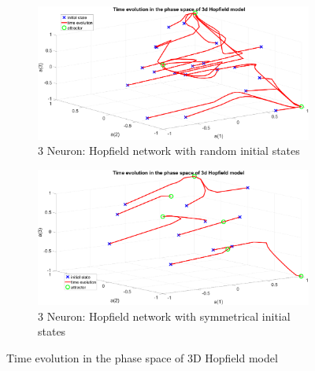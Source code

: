 \begin{figure}[!htpb]
	\centering
	\begin{subfigure}[b]{0.5\textwidth}
		\captionsetup{width=0.8\linewidth, format = hang}
		\includegraphics[height = 0.6\textwidth,width = 1\textwidth]{Exercise2/Report/hop3d_1}
		\caption{3 Neuron: Hopfield network with random initial states }\label{fig:hop3d_1}
	\end{subfigure}%
	\begin{subfigure}[b]{0.5\textwidth}
		\captionsetup{width=0.8\linewidth, format = hang}
		\includegraphics[height = 0.6\textwidth,width = 1\textwidth]{Exercise2/Report/hop3d_2}
		\caption{3 Neuron: Hopfield network with symmetrical initial states}\label{fig:hop3d_2}
	\end{subfigure}%
	\caption{Time evolution in the phase space of 3D Hopfield model }
	\label{fig:hop_3c}
\end{figure}

